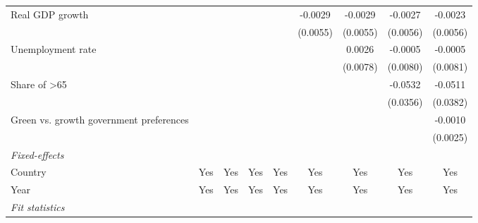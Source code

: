 \begin{table}[htbp]
\begin{tabular}{lcccccccc}
      Real GDP growth                                                         &          &          &                &                 & -0.0029         & -0.0029         & -0.0027         & -0.0023\\   
                                                                              &          &          &                &                 & (0.0055)        & (0.0055)        & (0.0056)        & (0.0056)\\   
      Unemployment rate                                                       &          &          &                &                 &                 & 0.0026          & -0.0005         & -0.0005\\   
                                                                              &          &          &                &                 &                 & (0.0078)        & (0.0080)        & (0.0081)\\   
      Share of >65                                                            &          &          &                &                 &                 &                 & -0.0532         & -0.0511\\   
                                                                              &          &          &                &                 &                 &                 & (0.0356)        & (0.0382)\\   
      Green vs. growth government preferences                                 &          &          &                &                 &                 &                 &                 & -0.0010\\   
                                                                              &          &          &                &                 &                 &                 &                 & (0.0025)\\   
      \midrule
      \emph{Fixed-effects}\\
      Country                                                                 & Yes      & Yes      & Yes            & Yes             & Yes             & Yes             & Yes             & Yes\\  
      Year                                                                    & Yes      & Yes      & Yes            & Yes             & Yes             & Yes             & Yes             & Yes\\  
      \midrule
      \emph{Fit statistics}\\

\end{tabular}
\end{table}
